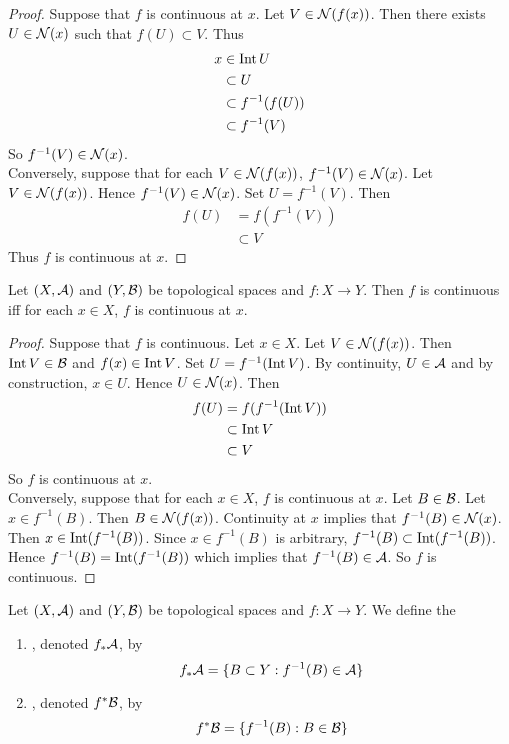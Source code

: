 \documentclass{book}
\begin{document}
	\begin{proof}
	Suppose that $f$ is continuous at $x$. Let $V \in \mathcal{N}(f(x))$. Then there exists $U \in \mathcal{N}(x)$ such that $f(U) \subset V$. Thus
	\begin{align*}
	x 
	&\in \operatorname{Int} U \\
	& \subset U \\
	&\subset f^{-1}(f(U)) \\
	&\subset f^{-1}(V)
	\end{align*}
	So $f^{-1}(V) \in \mathcal{N}(x)$.\\
	Conversely, suppose that for each $V \in \mathcal{N}(f(x))$, $f^{-1}(V) \in \mathcal{N}(x)$. Let $V \in \mathcal{N}(f(x))$. Hence $f^{-1}(V) \in \mathcal{N}(x)$. Set $U = f^{-1}(V)$. Then 
	\begin{align*}
	f(U) 
	&= f(f^{-1}(V)) \\
	& \subset V
	\end{align*}
	Thus $f$ is continuous at $x$.
	\end{proof}
	
	\begin{ex} 
	Let $(X,\mathcal{A})$ and $(Y,\mathcal{B})$ be topological spaces and $f:X \rightarrow Y$. Then $f$ is continuous iff for each $x \in X$, $f$ is continuous at $x$.
	\end{ex}
	
	\begin{proof}
	Suppose that $f$ is continuous. Let $x \in X$. Let $V \in \mathcal{N}(f(x))$. Then $\operatorname{Int} V \in \mathcal{B}$ and $f(x) \in \operatorname{Int} V$. Set $U = f^{-1}(\operatorname{Int} V)$. By continuity, $U \in \mathcal{A}$ and by construction, $x \in U$. Hence $U \in \mathcal{N}(x)$. Then 
	\begin{align*}
	f(U)
	&= f(f^{-1}(\operatorname{Int} V))\\
	& \subset \operatorname{Int} V\\
	& \subset V
\end{align*}	 	
So $f$ is continuous at $x$. \\
Conversely, suppose that for each $x \in X$, $f$ is continuous at $x$. Let $B \in \mathcal{B}$. Let $x \in f^{-1}(B)$. Then $B \in \mathcal{N}(f(x))$. Continuity at $x$ implies that $f^{-1}(B) \in \mathcal{N}(x)$. Then $x \in \operatorname{Int} (f^{-1}(B))$. Since $x \in f^{-1}(B)$ is arbitrary, $f^{-1}(B) \subset \operatorname{Int} (f^{-1}(B))$. Hence $f^{-1}(B) = \operatorname{Int} (f^{-1}(B))$ which implies that $f^{-1}(B) \in \mathcal{A}$. So $f$ is continuous.
	\end{proof}
	
	\begin{defn} 
	Let $(X, \mathcal{A})$ and $(Y,\mathcal{B})$ be topological spaces and $f: X \rightarrow Y$. We define the 
	\begin{enumerate}
	\item {}, denoted $f_*\mathcal{A}$, by 
	$$f_*\mathcal{A} = \{B \subset Y: f^{-1}(B) \in \mathcal{A}\}$$ 
	\item  {}, denoted $f^*\mathcal{B}$, by  
	$$f^*\mathcal{B} = \{f^{-1}(B):  B \in \mathcal{B} \}$$
	\end{enumerate}
	\end{defn}
	
\end{document}
